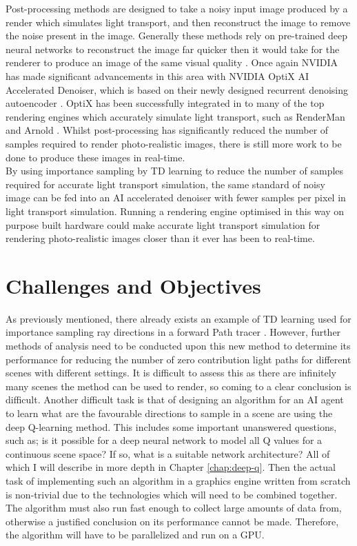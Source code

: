 \documentclass[ %
                    author={Callum Pearce},
                supervisor={Dr. Neill Campbell},
                    degree={MEng},
                     title={How effective are Temporal difference learning methods for reducing the number of zero contribution light paths while still accurately approximating Global Illumination in Path tracing?},
                  subtitle={},
                      type={research},
                      year={2019} ]{dissertation}
\begin{document}
Post-processing methods are designed to take a noisy input image produced by a render which simulates light transport, and then reconstruct the image to remove the noise present in the image. Generally these methods rely on pre-trained deep neural networks to reconstruct the image far quicker then it would take for the renderer to produce an image of the same visual quality \cite{bako2017kernel}. Once again NVIDIA has made significant advancements in this area with NVIDIA OptiX AI Accelerated Denoiser, which is based on their newly designed recurrent denoising autoencoder \cite{chaitanya2017interactive}. OptiX has been successfully integrated in to many of the top rendering engines which accurately simulate light transport, such as RenderMan \cite{christensen2018renderman} and Arnold \cite{georgiev2018arnold}. Whilst post-processing has significantly reduced the number of samples required to render photo-realistic images, there is still more work to be done to produce these images in real-time.\\

By using importance sampling by TD learning to reduce the number of samples required for accurate light transport simulation, the same standard of noisy image can be fed into an AI accelerated denoiser with fewer samples per pixel in light transport simulation. Running a rendering engine optimised in this way on purpose built hardware could make accurate light transport simulation for rendering photo-realistic images closer than it ever has been to real-time.

\section{Challenges and Objectives}

As previously mentioned, there already exists an example of TD learning used for importance sampling ray directions in a forward Path tracer \cite{dahm2017learning}. However, further methods of analysis need to be conducted upon this new method to determine its performance for reducing the number of zero contribution light paths for different scenes with different settings. It is difficult to assess this as there are infinitely many scenes the method can be used to render, so coming to a clear conclusion is difficult. Another difficult task is that of designing an algorithm for an AI agent to learn what are the favourable directions to sample in a scene are using the deep Q-learning method. This includes some important unanswered questions, such as; is it possible for a deep neural network to model all Q values for a continuous scene space? If so, what is a suitable network architecture? All of which I will describe in more depth in Chapter \ref{chap:deep-q}. Then the actual task of implementing such an algorithm in a graphics engine written from scratch is non-trivial due to the technologies which will need to be combined together. The algorithm must also run fast enough to collect large amounts of data from, otherwise a justified conclusion on its performance cannot be made. Therefore, the algorithm will have to be parallelized and run on a GPU.
\end{document}
